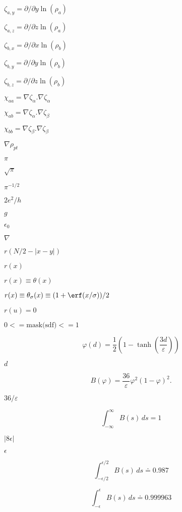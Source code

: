 \documentclass{article}
\begin{document}
$ \zeta_{a,y}=\partial/{\partial y} \ln(\rho_a)  $
\pagebreak

$ \zeta_{a,z}=\partial/{\partial z} \ln(\rho_a)  $
\pagebreak

$ \zeta_{b,x} = \partial/{\partial x} \ln(\rho_b)  $
\pagebreak

$ \zeta_{b,y} = \partial/{\partial y} \ln(\rho_b)  $
\pagebreak

$ \zeta_{b,z} = \partial/{\partial z} \ln(\rho_b)  $
\pagebreak

$ \chi_{aa} = \nabla \zeta_{\alpha}.\nabla \zeta_{\alpha} $
\pagebreak

$ \chi_{ab} = \nabla \zeta_{\alpha}.\nabla \zeta_{\beta} $
\pagebreak

$ \chi_{bb} = \nabla \zeta_{\beta}.\nabla \zeta_{\beta} $
\pagebreak

$ \nabla\rho_{pt}$
\pagebreak

$\pi$
\pagebreak

$\sqrt{\pi}$
\pagebreak

$\pi^{-1/2}$
\pagebreak

$ 2e^2/h $
\pagebreak

$ g $
\pagebreak

$\epsilon_0$
\pagebreak

$ \nabla $
\pagebreak

$ r(N/2 - |x-y|) $
\pagebreak

$ r(x) $
\pagebreak

$ r(x) \equiv \theta(x)$
\pagebreak

$ r(x) \equiv \theta_\sigma(x) \equiv (1 + \erf(x/\sigma))/2 $
\pagebreak

$r(u) = 0$
\pagebreak

$0 <=  \mbox{mask(sdf)} <= 1$
\pagebreak

\[ \varphi(d) = \frac{1}{2}\left( 1 - \tanh\left(
                 \frac{3d}{\varepsilon} \right) \right) \]
\pagebreak

$d$
\pagebreak

\[ B(\varphi) = \frac{36}{\varepsilon} \varphi^2 (1-\varphi)^2. \]
\pagebreak

$36/\varepsilon$
\pagebreak

\[ \int_{-\infty}^\infty B(s) \, ds = 1 \]
\pagebreak

$ |8 \epsilon| $
\pagebreak

$ \epsilon $
\pagebreak

\[ \int_{-\epsilon/2}^{\epsilon/2} B(s) \, ds \doteq 0.987 \]
\pagebreak

\[ \int_{-\epsilon}^{\epsilon} B(s) \, ds \doteq 0.999963 \]
\pagebreak
\end{document}
